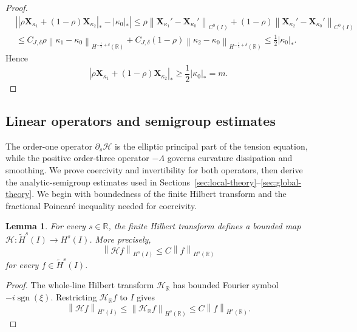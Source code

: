 \documentclass[11pt,reqno]{amsart}
\theoremstyle{plain}
\newtheorem{lemma}[theorem]{Lemma}
\theoremstyle{definition}
\numberwithin{equation}{section}
\newcommand{\paren}[1]{\left(#1\right)}
\newcommand{\p}{\partial}
\newcommand{\mc}[1]{\mathcal{#1}}
\newcommand{\wt}[1]{\widetilde{#1}}
\newcommand{\bm}[1]{\boldsymbol{#1}}
\newcommand{\abs}[1]{\left\lvert #1 \right\rvert}
\newcommand{\norm}[1]{\left\lVert #1 \right\rVert}
\newcommand{\R}{\mathbb{R}}
\newcommand{\xka}[1]{\bm X_{\kappa_{#1}}}
\newcommand{\ci}[1]{C^{#1}(I)}
\newcommand{\hr}[1]{H^{#1}(\R)}
\begin{document}
\begin{proof}
\begin{equation}
\begin{aligned}
&\abs{\abs{\rho\xka{1}+(1-\rho)\xka{2}}_* - \abs{\kappa_0}_* }
\le \rho\norm{\xka{1}'-\xka{0}'}_{\ci{0}}
+(1-\rho)\norm{\xka{2}'-\xka{0}'}_{\ci{0}} \\
&\le C_{J,\delta} \rho\norm{\kappa_1-\kappa_0}_{\hr{-\frac{1}{2}+\delta}}
+C_{J,\delta}(1-\rho)\norm{\kappa_2-\kappa_0}_{\hr{-\frac{1}{2}+\delta}}
\le \frac{1}{2}\abs{\kappa_0}_*.
\end{aligned}
\end{equation}
Hence
\begin{equation}
    \abs{\rho\xka{1} + \paren{1-\rho}\xka{2}}_*
    \ge \frac{1}{2}\abs{\kappa_0}_*=m.
\end{equation}
\end{proof}

\subsection{Linear operators and semigroup estimates}
\label{subsec:linear-theory}
\label{subsec:interval-regularity}

The order-one operator $\p_s\mc H$ is the elliptic principal part of the
tension equation, while the positive order-three operator $-\Lambda$
governs curvature dissipation and smoothing. We prove coercivity and
invertibility for both operators, then derive the analytic-semigroup
estimates used in Sections~\ref{sec:local-theory}--\ref{sec:global-theory}.
We begin with boundedness of the finite Hilbert transform and the
fractional Poincar\'e inequality needed for coercivity.

\begin{lemma}\label{Hf-bounded}
For every $s\in\R$, the finite Hilbert transform defines a bounded map
$\mc H:\wt H^s(I)\to H^s(I)$. More precisely,
\begin{equation}\label{eqn:hilbert-bound}
    \norm{\mc Hf}_{H^s(I)} \le C\norm{f}_{H^s(\R)}
\end{equation}
for every $f\in\wt H^s(I)$.
\end{lemma}
\begin{proof}
The whole-line Hilbert transform $\mc H_{\R}$ has bounded Fourier symbol
$-i\operatorname{sgn}(\xi)$. Restricting $\mc H_{\R}f$ to $I$ gives
\begin{equation}
    \norm{\mc Hf}_{H^s(I)}
    \le \norm{\mc H_{\R}f}_{H^s(\R)}
    \le C\norm{f}_{H^s(\R)}.
\end{equation}
\end{proof}
\end{document}
